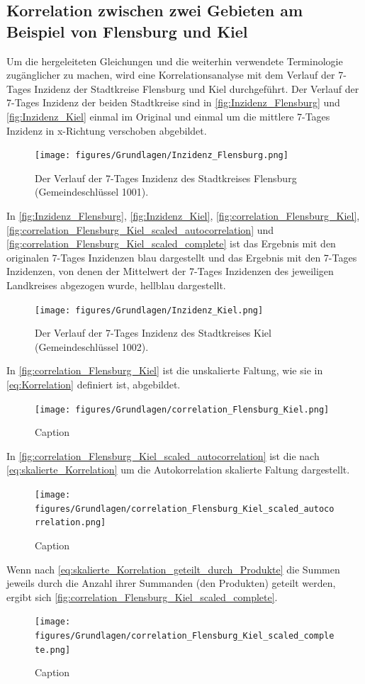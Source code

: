 \subsection{Korrelation zwischen zwei Gebieten am Beispiel von Flensburg und Kiel}
Um die hergeleiteten Gleichungen und die weiterhin verwendete Terminologie zugänglicher zu machen, wird eine Korrelationsanalyse mit dem Verlauf der 7-Tages Inzidenz der Stadtkreise Flensburg und Kiel durchgeführt. Der Verlauf der 7-Tages Inzidenz der beiden Stadtkreise sind in \autoref{fig:Inzidenz_Flensburg} und \autoref{fig:Inzidenz_Kiel} einmal im Original und einmal um die mittlere 7-Tages Inzidenz in x-Richtung verschoben abgebildet.

\begin{figure}[H]
    \centering
    \texttt{[image: figures/Grundlagen/Inzidenz\_Flensburg.png]}
    \caption{Der Verlauf der 7-Tages Inzidenz des Stadtkreises Flensburg (Gemeindeschlüssel 1001).}
    \label{fig:Inzidenz_Flensburg}
\end{figure}
In \autoref{fig:Inzidenz_Flensburg}, \autoref{fig:Inzidenz_Kiel}, \autoref{fig:correlation_Flensburg_Kiel}, \autoref{fig:correlation_Flensburg_Kiel_scaled_autocorrelation} und \autoref{fig:correlation_Flensburg_Kiel_scaled_complete} ist das Ergebnis mit den originalen 7-Tages Inzidenzen blau dargestellt und das Ergebnis mit den 7-Tages Inzidenzen, von denen der Mittelwert der 7-Tages Inzidenzen des jeweiligen Landkreises abgezogen wurde, hellblau dargestellt.
\begin{figure}[H]
    \centering
    \texttt{[image: figures/Grundlagen/Inzidenz\_Kiel.png]}
    \caption{Der Verlauf der 7-Tages Inzidenz des Stadtkreises Kiel (Gemeindeschlüssel 1002).}
    \label{fig:Inzidenz_Kiel}
\end{figure}
In \autoref{fig:correlation_Flensburg_Kiel} ist die unskalierte Faltung, wie sie in \autoref{eq:Korrelation} definiert ist, abgebildet.
\begin{figure}[H]
    \centering
    \texttt{[image: figures/Grundlagen/correlation\_Flensburg\_Kiel.png]}
    \caption{Caption}
    \label{fig:correlation_Flensburg_Kiel}
\end{figure}
In \autoref{fig:correlation_Flensburg_Kiel_scaled_autocorrelation} ist die nach \autoref{eq:skalierte_Korrelation} um die Autokorrelation skalierte Faltung dargestellt.
\begin{figure}[H]
    \centering
    \texttt{[image: figures/Grundlagen/correlation\_Flensburg\_Kiel\_scaled\_autocorrelation.png]}
    \caption{Caption}
    \label{fig:correlation_Flensburg_Kiel_scaled_autocorrelation}
\end{figure}
Wenn nach \autoref{eq:skalierte_Korrelation_geteilt_durch_Produkte} die  Summen jeweils durch die Anzahl ihrer Summanden (den Produkten) geteilt werden, ergibt sich \autoref{fig:correlation_Flensburg_Kiel_scaled_complete}.
\begin{figure}[H]
    \centering
    \texttt{[image: figures/Grundlagen/correlation\_Flensburg\_Kiel\_scaled\_complete.png]}
    \caption{Caption}
    \label{fig:correlation_Flensburg_Kiel_scaled_complete}
\end{figure}

